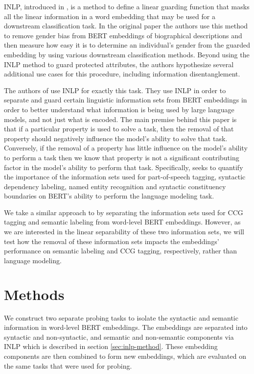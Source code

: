 \documentclass[11pt,a4paper]{article}
\begin{document}
INLP, introduced in \citep{inlp}, is a method to define a linear guarding function that masks all the linear information in a word embedding that may be used for a downstream classification task. In the original paper the authors use this method to remove gender bias from BERT embeddings of biographical descriptions and then measure how easy it is to determine an individual's gender from the guarded embedding by using various downstream classification methods. Beyond using the INLP method to guard protected attributes, the authors hypothesize several additional use cases for this procedure, including information disentanglement. 

The authors of \citep{amnesia} use INLP for exactly this task. They use INLP in order to separate and guard certain linguistic information sets from BERT embeddings in order to better understand what information is being used by large language models, and not just what is encoded. The main premise behind this paper is that if a particular property is used to solve a task, then the removal of that property should negatively influence the model's ability to solve that task. Conversely, if the removal of a property has little influence on the model's ability to perform a task then we know that property is not a significant contributing factor in the model's ability to perform that task. Specifically, \citep{amnesia} seeks to quantify the importance of the information sets used for part-of-speech tagging, syntactic dependency labeling, named entity recognition and syntactic constituency boundaries on BERT's ability to perform the language modeling task. 

We take a similar approach to \citep{amnesia} by separating the information sets used for CCG tagging and semantic labeling from word-level BERT embeddings. However, as we are interested in the linear separability of these two information sets, we will test how the removal of these information sets impacts the embeddings' performance on semantic labeling and CCG tagging, respectively, rather than language modeling. 



\section{Methods}
\label{sec:method}


We construct two separate probing tasks to isolate the syntactic and semantic information in word-level BERT embeddings. The embeddings are separated into syntactic and non-syntactic, and semantic and non-semantic components via INLP which is described in section \ref{sec:inlp-method}. These embedding components are then combined to form new embeddings, which are evaluated on the same tasks that were used for probing. %
\end{document}
